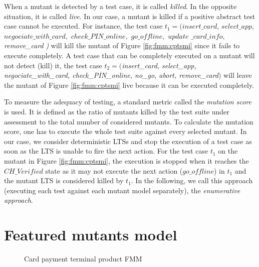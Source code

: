 When a mutant is detected by a test case, it is called \emph{killed}. In the opposite situation, it is called \emph{live}. 
In our case, a mutant is killed if a positive abstract test case cannot be executed. For instance, the test case $t_1=( \mathit{insert\_card}$, $\mathit{select\_app},$ $\mathit{negociate\_with\_card},$ $\mathit{check\_PIN\_online},$ $\mathit{go\_offline},$ $\mathit{update}$ $\mathit{\_card\_info},$ \textit{re\-mo\-ve\-\_\-ca\-rd} \textit{)} will kill the mutant of Figure \ref{fig:fmm:cptsmi} since it fails to execute completely. A test case that can be completely executed on a mutant will not detect (kill) it, \eg the test case $t_2=($\textit{insert\_card, select\_app, negociate\_with\_card, check\_PIN\_online, no\_go, abort, remove\_card}$)$ will leave the mutant of Figure \ref{fig:fmm:cptsmi} live because it can be executed completely.

To measure the adequacy of testing, a standard metric called the \emph{mutation score} is used. It is defined as the ratio of mutants killed by the test suite under assessment to the total number of considered mutants. To calculate the mutation score, one has to execute the whole test suite against every selected mutant. In our case, we consider deterministic LTSs and stop the execution of a test case as soon as the LTS is unable to fire the next action. For the test case $t_1$ on the mutant in Figure \ref{fig:fmm:cptsmi}, the execution is stopped when it reaches the $\mathit{CH\_Verified}$ state as it may not execute the next action ($\mathit{go\_offline}$) in $t_1$ and the mutant LTS is considered killed by $t_1$. 
In the following,  we call this approach (\ie executing each test against each mutant model separately), the \emph{enumerative approach}. 


\section{Featured mutants model}

\label{sec:FMM}

\begin{figure}
	\centering
	\caption{Card payment terminal product FMM}
	\label{fig:fmm:cptmutantsfmm}
\end{figure}

